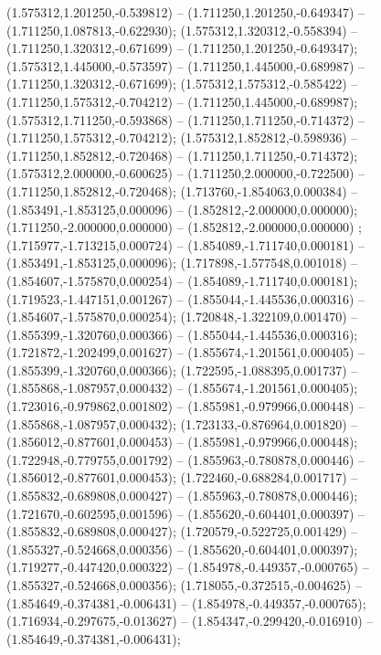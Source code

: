  (1.575312,1.201250,-0.539812) -- (1.711250,1.201250,-0.649347) -- (1.711250,1.087813,-0.622930);
 (1.575312,1.320312,-0.558394) -- (1.711250,1.320312,-0.671699) -- (1.711250,1.201250,-0.649347);
 (1.575312,1.445000,-0.573597) -- (1.711250,1.445000,-0.689987) -- (1.711250,1.320312,-0.671699);
 (1.575312,1.575312,-0.585422) -- (1.711250,1.575312,-0.704212) -- (1.711250,1.445000,-0.689987);
 (1.575312,1.711250,-0.593868) -- (1.711250,1.711250,-0.714372) -- (1.711250,1.575312,-0.704212);
 (1.575312,1.852812,-0.598936) -- (1.711250,1.852812,-0.720468) -- (1.711250,1.711250,-0.714372);
 (1.575312,2.000000,-0.600625) -- (1.711250,2.000000,-0.722500) -- (1.711250,1.852812,-0.720468);
 (1.713760,-1.854063,0.000384) -- (1.853491,-1.853125,0.000096) -- (1.852812,-2.000000,0.000000);
 (1.711250,-2.000000,0.000000) -- (1.852812,-2.000000,0.000000) ;
 (1.715977,-1.713215,0.000724) -- (1.854089,-1.711740,0.000181) -- (1.853491,-1.853125,0.000096);
 (1.717898,-1.577548,0.001018) -- (1.854607,-1.575870,0.000254) -- (1.854089,-1.711740,0.000181);
 (1.719523,-1.447151,0.001267) -- (1.855044,-1.445536,0.000316) -- (1.854607,-1.575870,0.000254);
 (1.720848,-1.322109,0.001470) -- (1.855399,-1.320760,0.000366) -- (1.855044,-1.445536,0.000316);
 (1.721872,-1.202499,0.001627) -- (1.855674,-1.201561,0.000405) -- (1.855399,-1.320760,0.000366);
 (1.722595,-1.088395,0.001737) -- (1.855868,-1.087957,0.000432) -- (1.855674,-1.201561,0.000405);
 (1.723016,-0.979862,0.001802) -- (1.855981,-0.979966,0.000448) -- (1.855868,-1.087957,0.000432);
 (1.723133,-0.876964,0.001820) -- (1.856012,-0.877601,0.000453) -- (1.855981,-0.979966,0.000448);
 (1.722948,-0.779755,0.001792) -- (1.855963,-0.780878,0.000446) -- (1.856012,-0.877601,0.000453);
 (1.722460,-0.688284,0.001717) -- (1.855832,-0.689808,0.000427) -- (1.855963,-0.780878,0.000446);
 (1.721670,-0.602595,0.001596) -- (1.855620,-0.604401,0.000397) -- (1.855832,-0.689808,0.000427);
 (1.720579,-0.522725,0.001429) -- (1.855327,-0.524668,0.000356) -- (1.855620,-0.604401,0.000397);
 (1.719277,-0.447420,0.000322) -- (1.854978,-0.449357,-0.000765) -- (1.855327,-0.524668,0.000356);
 (1.718055,-0.372515,-0.004625) -- (1.854649,-0.374381,-0.006431) -- (1.854978,-0.449357,-0.000765);
 (1.716934,-0.297675,-0.013627) -- (1.854347,-0.299420,-0.016910) -- (1.854649,-0.374381,-0.006431);
